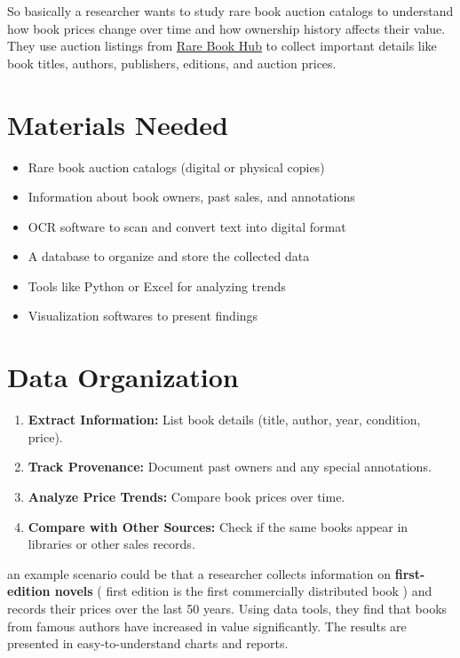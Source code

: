 \documentclass[a4paper]{exam}
\begin{document}
\begin{questions}
So basically a researcher wants to study rare book auction catalogs to understand how book prices change over time and how ownership history affects their value. They use auction listings from \href{https://www.rarebookhub.com/catalogues/}{Rare Book Hub} to collect important details like book titles, authors, publishers, editions, and auction prices.

\section*{Materials Needed}
\begin{itemize}
    \item Rare book auction catalogs (digital or physical copies)
    \item Information about book owners, past sales, and annotations
    \item OCR software to scan and convert text into digital format
    \item A database to organize and store the collected data
    \item Tools like Python or Excel for analyzing trends
    \item Visualization softwares to present findings
\end{itemize}

\section*{Data Organization}
\begin{enumerate}
    \item \textbf{Extract Information:} List book details (title, author, year, condition, price).
    \item \textbf{Track Provenance:} Document past owners and any special annotations.
    \item \textbf{Analyze Price Trends:} Compare book prices over time.
    \item \textbf{Compare with Other Sources:} Check if the same books appear in libraries or other sales records.
\end{enumerate}


an example scenario could be that a researcher collects information on \textbf{first-edition novels} ( first edition is the first commercially distributed book ) and records their prices over the last 50 years. Using data tools, they find that books from famous authors have increased in value significantly. The results are presented in easy-to-understand charts and reports.



\end{questions}
\end{document}
